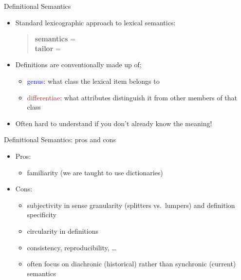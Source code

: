 \documentclass{beamer}
\begin{document}
\begin{frame}{Definitional Semantics}


  \begin{itemize}
  \item Standard lexicographic approach to lexical semantics:
    \begin{quote}
      \textbf{semantics} = \\
      \textbf{tailor} = 
    \end{quote}
  \item Definitions are conventionally made up of;
    \begin{itemize}
    \item \textcolor{blue}{genus}: what class the lexical item belongs to
    \item \textcolor{brown}{differentiae}: what attributes distinguish it from
      other members of that class
    \end{itemize}
  \item Often hard  to understand if you don't already know the meaning!
  \end{itemize}
\end{frame}

\begin{frame}{Definitional Semantics: pros and cons}
  \begin{itemize}
  \item Pros:
  \begin{itemize}
  \item familiarity (we are taught to use dictionaries)
  \end{itemize}
\item Cons:
  \begin{itemize}
  \item subjectivity in sense granularity (splitters vs.\ lumpers) and
    definition specificity
  \item circularity in definitions
  \item consistency, reproducibility, \ldots
  \item often focus on diachronic (historical) rather than synchronic (current) semantics 
  \end{itemize}
\end{itemize}
\end{frame}
\end{document}
